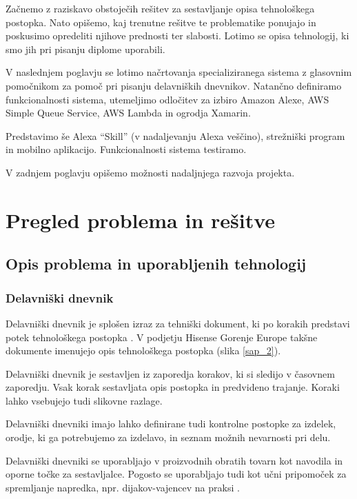 \documentclass[a4paper, 12pt]{book}
\begin{document}
Začnemo z raziskavo obstoječih rešitev za sestavljanje opisa tehnološkega postopka.
Nato opišemo, kaj trenutne rešitve te problematike ponujajo in poskusimo opredeliti njihove prednosti ter slabosti.
Lotimo se opisa tehnologij, ki smo jih pri pisanju diplome uporabili.

V naslednjem poglavju se lotimo načrtovanja specializiranega sistema z glasovnim pomočnikom za pomoč pri pisanju delavniških dnevnikov.
Natančno definiramo funkcionalnosti sistema, utemeljimo odločitev za izbiro Amazon Alexe, AWS Simple Queue Service, AWS Lambda in ogrodja Xamarin.

Predstavimo še Alexa \enquote{Skill} (v nadaljevanju Alexa veščino), strežniški program in mobilno aplikacijo.
Funkcionalnosti sistema testiramo.

V zadnjem poglavju opišemo možnosti nadaljnjega razvoja projekta.

\chapter{Pregled problema in rešitve}

\section{Opis problema in uporabljenih tehnologij}

\subsection {Delavniški dnevnik}

Delavniški dnevnik je splošen izraz za tehniški dokument, ki po korakih predstavi potek tehnološkega postopka \cite{delavniskidnevnikptuj}.
V podjetju Hisense Gorenje Europe takšne dokumente imenujejo opis tehnološkega postopka (slika \ref{sap_2}).

Delavniški dnevnik je sestavljen iz zaporedja korakov, ki si sledijo v časovnem zaporedju.
Vsak korak sestavljata opis postopka in predvideno trajanje.
Koraki lahko vsebujejo tudi slikovne razlage.

Delavniški dnevniki imajo lahko definirane tudi kontrolne postopke za izdelek, orodje, ki ga potrebujemo za izdelavo, in seznam možnih nevarnosti pri delu.

Delavniški dnevniki se uporabljajo v proizvodnih obratih tovarn kot navodila in oporne točke za sestavljalce.
Pogosto se uporabljajo tudi kot učni pripomoček za spremljanje napredka, npr. dijakov-vajencev na praksi \cite{delavniskidnevnikptuj, ddsclj}.
\end{document}
